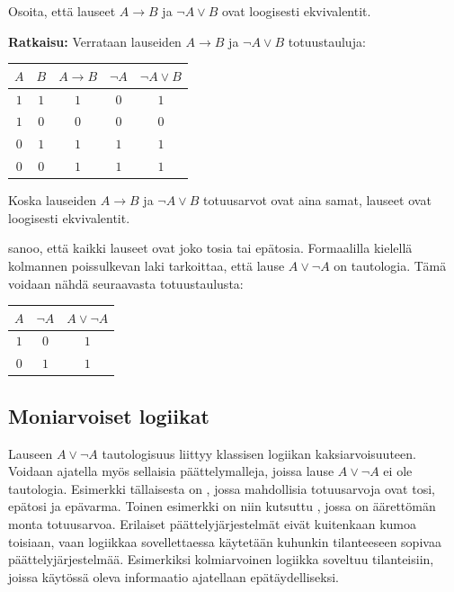 \begin{esimerkki}
 Osoita, että lauseet $A\to B$ ja $\lnot A \lor B$ ovat loogisesti
ekvivalentit.

{\bf Ratkaisu:}
Verrataan lauseiden $A\to B$ ja $\lnot A \lor B$
totuustauluja: 

\begin{center}
\begin{tabular}{|c|c|c|c|c|}\hline
$A$ & $B$ & $A\to B$ & $\lnot A$ & $\lnot A\lor B$ \\ \hline
$1$ & $1$ & $1$ & $0$ & $1$  \\ %
$1$ & $0$ & $0$ & $0$ & $0$  \\
$0$ & $1$ & $1$ & $1$ & $1$  \\
$0$ & $0$ & $1$ & $1$ & $1$  \\ \hline
\end{tabular}
\end{center}

Koska lauseiden $A\to B$ ja $\lnot A \lor B$ totuusarvot
ovat aina samat, lauseet ovat loogisesti ekvivalentit.
\end{esimerkki}

 sanoo, että kaikki lauseet ovat joko tosia tai epätosia. Formaalilla kielellä kolmannen poissulkevan laki tarkoittaa, että lause $A \lor \lnot A$ on tautologia. Tämä voidaan nähdä seuraavasta totuustaulusta:

\bigskip

\begin{center}
\begin{tabular}{|c|c|c|}\hline
$A$ & $\lnot A$ & $A \lor  \lnot A$ \\ \hline
$1$ & $0$ & $1$\\
$0$ & $1$ & $1$\\ \hline
\end{tabular}
\end{center}

\bigskip


\subsection*{Moniarvoiset logiikat}%
Lauseen $A \lor \lnot A$ tautologisuus liittyy klassisen logiikan kaksiarvoisuuteen. Voidaan ajatella myös sellaisia päättelymalleja, joissa lause $A \lor \lnot A$ ei ole tautologia. Esimerkki tällaisesta on , jossa mahdollisia totuusarvoja ovat tosi, epätosi ja epävarma.  Toinen esimerkki on niin kutsuttu , jossa on äärettömän monta totuusarvoa. Erilaiset päättelyjärjestelmät eivät kuitenkaan kumoa toisiaan, vaan logiikkaa sovellettaessa käytetään kuhunkin tilanteeseen sopivaa päättelyjärjestelmää. Esimerkiksi kolmiarvoinen logiikka soveltuu tilanteisiin, joissa käytössä oleva informaatio ajatellaan epätäydelliseksi.


